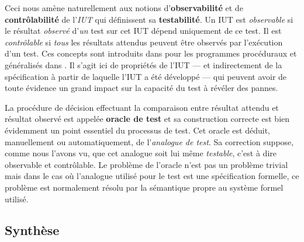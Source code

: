 Ceci nous am\`ene naturellement aux notions d'\textbf{observabilit\'e}
et de \textbf{contr\^olabilit\'e} de l'\emph{IUT} qui d\'efinissent
sa \textbf{testabilit\'e}. Un \textsf{IUT} est \emph{observable} si le
r\'esultat \emph{observ\'e} d'\emph{un} test sur cet \textsf{IUT} d\'epend uniquement
de ce test. Il est \emph{contr\^olable} si \emph{tous} les r\'esultats
attendus peuvent \^etre observ\'es par l'ex\'ecution d'un test. Ces
concepts sont introduits dans \cite{freedman-testability} pour les programmes
proc\'eduraux et g\'en\'eralis\'es dans \cite{formspectest}. Il
s'agit ici de propri\'et\'es de l'\textsf{IUT} --- et indirectement de la
sp\'ecification \`a partir de laquelle l'\textsf{IUT} a \'et\'e
d\'evelopp\'e --- qui peuvent avoir de toute \'evidence un grand
impact sur la capacit\'e du test \`a r\'ev\'eler des pannes.

La proc\'edure de d\'ecision effectuant la comparaison entre r\'esultat attendu et r\'esultat observ\'e est
appel\'ee \textbf{oracle de test} et sa construction correcte est
bien \'evidemment un point essentiel du processus de test. Cet oracle
est d\'eduit, manuellement ou automatiquement, de l'\emph{analogue de
  test}. Sa correction suppose, comme nous l'avons vu, que cet
analogue soit lui m\^eme \emph{testable}, c'est \`a dire observable et
contr\^olable. Le probl\`eme de l'oracle n'est pas un probl\`eme
trivial mais dans le cas o\`u l'analogue utilis\'e pour le test est
une sp\'ecification formelle, ce probl\`eme est normalement
r\'esolu par la s\'emantique propre au syst\`eme formel utilis\'e.

\subsection{Synth\`ese}


